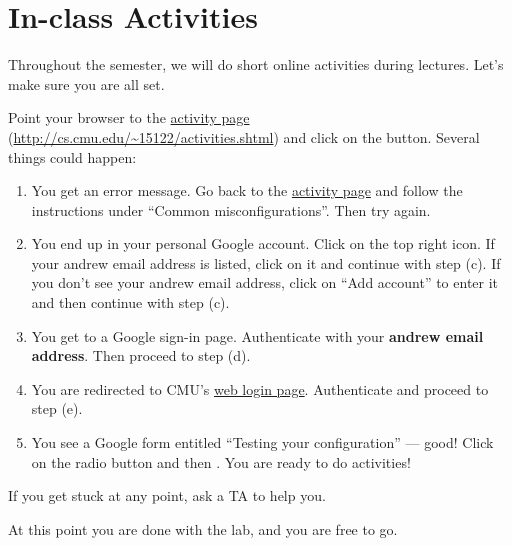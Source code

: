 \section*{In-class Activities}

Throughout the semester, we will do short online activities during
lectures.  Let's make sure you are all set.

\begin{part}
  Point your browser to the
  \href{http://cs.cmu.edu/~15122/activities.shtml}{activity page}
  (\url{http://cs.cmu.edu/~15122/activities.shtml}) and click on the
   button.  Several things could happen:
  \begin{enumerate}
  \item%
    You get an error message.  Go back to the
    \href{http://cs.cmu.edu/~15122/activities.shtml}{activity page}
    and follow the instructions under ``Common misconfigurations''.
    Then try again.
  \item%
    You end up in your personal Google account.  Click on the top
    right icon.  If your andrew email address is listed, click on it
    and continue with step (c).  If you don't see your andrew email
    address, click on ``Add account'' to enter it and then continue
    with step (c).
  \item%
    You get to a Google sign-in page.  Authenticate with your
    \textbf{andrew email address}.  Then proceed to step (d).
  \item%
    You are redirected to CMU's \href{https://login.cmu.edu/}{web
      login page}.  Authenticate and proceed to step (e).
  \item%
    You see a Google form entitled ``Testing your configuration'' ---
    good! Click on the radio button and then .
    You are ready to do activities!
  \end{enumerate}
  If you get stuck at any point, ask a TA to help you.
\end{part}

\bigskip
At this point you are done with the lab, and you are free to go.
